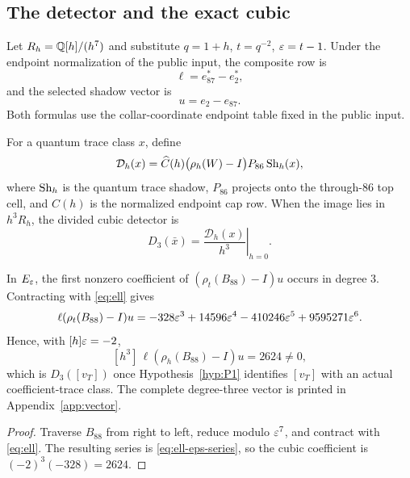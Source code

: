 \subsection{The detector and the exact cubic}

Let $R_h=\mathbb{Q}[h]/(h^7)$ and substitute $q=1+h$, $t=q^{-2}$, $\varepsilon=t-1$.
Under the endpoint normalization of the public input, the composite row is
\begin{equation}\label{eq:ell}
\ell=e_{87}^{*}-e_2^{*},
\end{equation}
and the selected shadow vector is
\begin{equation}\label{eq:u}
u=e_2-e_{87}.
\end{equation}
Both formulas use the collar-coordinate endpoint table fixed in the public
input.

\begin{definition}\label{def:detector}
For a quantum trace class $x$, define
\[
\mathcal D_h(x)=
\widehat C(h)\bigl(\rho_h(W)-I\bigr)P_{86}\operatorname{Sh}_h(x),
\]
where $\operatorname{Sh}_h$ is the quantum trace shadow, $P_{86}$ projects onto the
through-$86$ top cell, and $\widehat C(h)$ is the normalized endpoint cap
row.  When the image lies in $h^3R_h$, the divided cubic detector is
\begin{equation}\label{eq:D3}
D_3(\bar x)=\left.\frac{\mathcal D_h(x)}{h^3}\right|_{h=0}.
\end{equation}
\end{definition}

\begin{proposition}\label{prop:D3-vT}
In $E_\varepsilon$, the first nonzero coefficient of $(\rho_t(B_{88})-I)u$ occurs in
degree $3$.  Contracting with \eqref{eq:ell} gives
\begin{equation}\label{eq:ell-eps-series}
\ell(\rho_t(B_{88})-I)u
=-328\varepsilon^3+14596\varepsilon^4-410246\varepsilon^5+9595271\varepsilon^6.
\end{equation}
Hence, with $[h]\varepsilon=-2$,
\begin{equation}\label{eq:D3-vT-value}
[h^3]\,\ell(\rho_h(B_{88})-I)u=2624\ne0,
\end{equation}
which is $D_3([v_T])$ once Hypothesis~\ref{hyp:P1} identifies $[v_T]$ with
an actual coefficient-trace class.
The complete degree-three vector is printed in Appendix~\ref{app:vector}.
\end{proposition}

\begin{proof}
Traverse $B_{88}$ from right to left, reduce modulo $\varepsilon^7$, and contract
with \eqref{eq:ell}.  The resulting series is
\eqref{eq:ell-eps-series}, so the cubic coefficient is $(-2)^3(-328)=2624$.
\end{proof}


